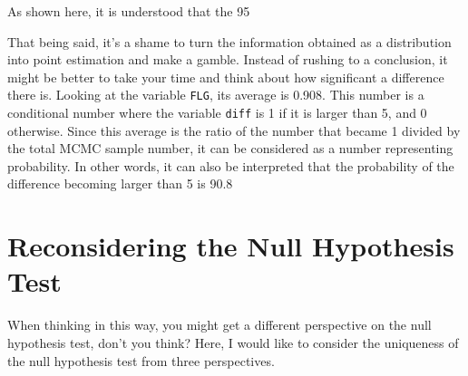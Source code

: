 \documentclass{ltjsbook}
\begin{document}
{%
As shown here, it is understood that the 95%

That being said, it's a shame to turn the information obtained as a distribution into point estimation and make a gamble. Instead of rushing to a conclusion, it might be better to take your time and think about how significant a difference there is.
Looking at the variable \verb|FLG|, its average is 0.908. This number is a conditional number where the variable \verb|diff| is 1 if it is larger than 5, and 0 otherwise. Since this average is the ratio of the number that became 1 divided by the total MCMC sample number, it can be considered as a number representing probability. In other words, it can also be interpreted that the probability of the difference becoming larger than 5 is 90.8%

\section{Reconsidering the Null Hypothesis Test}
When thinking in this way, you might get a different perspective on the null hypothesis test, don't you think? Here, I would like to consider the uniqueness of the null hypothesis test from three perspectives.
}
\end{document}
